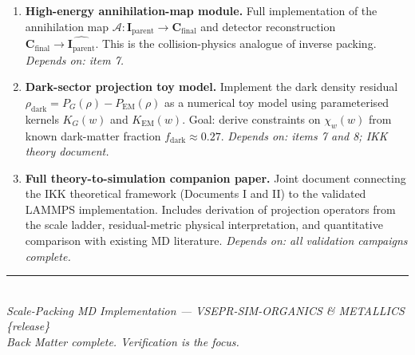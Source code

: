 \documentclass[11pt, a4paper, oneside]{article}
\newcommand{\Ann}{\mathcal{A}}
\newcommand{\Comp}[1]{\mathbf{C}_{#1}}
\newcommand{\Ident}[1]{\mathbf{I}_{#1}}
\newcommand{\DarkDens}{\rho_{\mathrm{dark}}}
\begin{document}
\begin{enumerate}[leftmargin=2em]
  \item \textbf{High-energy annihilation-map module.}
	Full implementation of the annihilation map
	$\Ann: \Ident{\mathrm{parent}} \to \Comp{\mathrm{final}}$
	and detector reconstruction
	$\Comp{\mathrm{final}} \to \widehat{\Ident{\mathrm{parent}}}$.
	This is the collision-physics analogue of
	inverse packing.
	\textit{Depends on: item 7.}

  \item \textbf{Dark-sector projection toy model.}
	Implement the dark density residual
	$\DarkDens = P_G(\rho) - P_{\mathrm{EM}}(\rho)$
	as a numerical toy model using parameterised
	kernels $K_G(w)$ and $K_{\mathrm{EM}}(w)$.
	Goal: derive constraints on $\chi_w(w)$ from
	known dark-matter fraction $f_{\mathrm{dark}} \approx 0.27$.
	\textit{Depends on: items 7 and 8; IKK theory document.}

  \item \textbf{Full theory-to-simulation companion paper.}
	Joint document connecting the IKK theoretical framework
	(Documents I and II) to the validated LAMMPS implementation.
	Includes derivation of projection operators from the
	scale ladder, residual-metric physical interpretation,
	and quantitative comparison with existing MD literature.
	\textit{Depends on: all validation campaigns complete.}

\end{enumerate}

\vfill
\begin{center}
  \rule{0.4\textwidth}{0.4pt}\\[0.5em]
  \textit{Scale-Packing MD Implementation ---
	VSEPR-SIM-ORGANICS \& METALLICS \{release\}\\
	Back Matter complete.
	Verification is the focus.}
\end{center}
\end{document}

